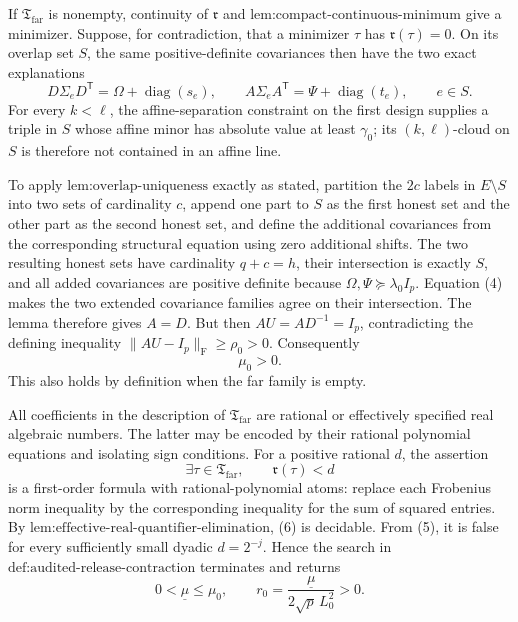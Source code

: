 If \(\mathfrak T_{\mathrm{far}}\) is nonempty, continuity of \(\mathfrak r\) and \(\text{lem:compact-continuous-minimum}\) give a minimizer.  Suppose, for contradiction, that a minimizer \(\tau\) has \(\mathfrak r(\tau)=0\).  On its overlap set \(S\), the same positive-definite covariances then have the two exact explanations
\[
 D\Sigma_eD^{\mathsf T}=\Omega+\operatorname{diag}(s_e),
 \qquad
 A\Sigma_eA^{\mathsf T}=\Psi+\operatorname{diag}(t_e),
 \qquad e\in S.
 \tag{4}
\]
For every \(k<\ell\), the affine-separation constraint on the first design supplies a triple in \(S\) whose affine minor has absolute value at least \(\gamma _0\); its \((k,\ell)\)-cloud on \(S\) is therefore not contained in an affine line.

To apply \(\text{lem:overlap-uniqueness}\) exactly as stated, partition the \(2c\) labels in \(E\setminus S\) into two sets of cardinality \(c\), append one part to \(S\) as the first honest set and the other part as the second honest set, and define the additional covariances from the corresponding structural equation using zero additional shifts.  The two resulting honest sets have cardinality \(q+c=h\), their intersection is exactly \(S\), and all added covariances are positive definite because \(\Omega,\Psi\succeq\lambda _0I_p\).  Equation (4) makes the two extended covariance families agree on their intersection.  The lemma therefore gives \(A=D\).  But then \(AU=AD^{-1}=I_p\), contradicting the defining inequality \(\|AU-I_p\|_{\mathrm F}\geq\rho _0>0\).  Consequently
\[
 \mu _0>0.
 \tag{5}
\]
This also holds by definition when the far family is empty.

All coefficients in the description of \(\mathfrak T_{\mathrm{far}}\) are rational or effectively specified real algebraic numbers.  The latter may be encoded by their rational polynomial equations and isolating sign conditions.  For a positive rational \(d\), the assertion
\[
 \exists\tau\in\mathfrak T_{\mathrm{far}},\qquad \mathfrak r(\tau)<d
 \tag{6}
\]
is a first-order formula with rational-polynomial atoms: replace each Frobenius norm inequality by the corresponding inequality for the sum of squared entries.  By \(\text{lem:effective-real-quantifier-elimination}\), (6) is decidable.  From (5), it is false for every sufficiently small dyadic \(d=2^{-j}\).  Hence the search in \(\text{def:audited-release-contraction}\) terminates and returns
\[
 0<\underline\mu\leq\mu _0,
 \qquad
 r_0=\frac{\underline\mu}{2\sqrt p\,L_0^2}>0.
 \tag{7}
\]

